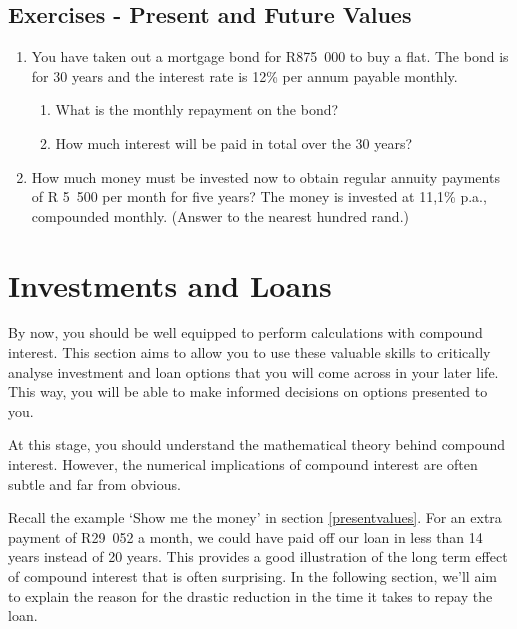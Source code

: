 
\subsection{Exercises - Present and Future Values}
\begin{enumerate}
\item{You have taken out a mortgage bond for R875~000 to buy a flat. The bond is for 30 years and the interest rate is 12\% per annum payable monthly.
\begin{enumerate}
\item What is the monthly repayment on the bond?
\item How much interest will be paid in total over the 30 years?
\end{enumerate}}
\item{How much money must be invested now to obtain regular annuity payments of R 5~500 per month for five years?  The money is invested at 11,1\% p.a., compounded monthly. (Answer to the nearest hundred rand.)}
\end{enumerate}

\section{Investments and Loans}
\label{s:investmentandloans}

By now, you should be well equipped to perform calculations with compound interest. This section aims to allow you to use these valuable skills to critically analyse investment and loan options that you will come across in your later life. This way, you will be able to make informed decisions on options presented to you.

At this stage, you should understand the mathematical theory behind compound interest. However, the numerical implications of compound interest are often subtle and far from obvious.

Recall the example `Show me the money' in section \ref{presentvalues}. For an extra payment of R29~052 a month, we could have paid off our loan in less than 14 years instead of 20 years. This provides a good illustration of the long term effect of compound interest that is often surprising. In the following section, we'll aim to explain the reason for the drastic reduction in the time it takes to repay the loan.

